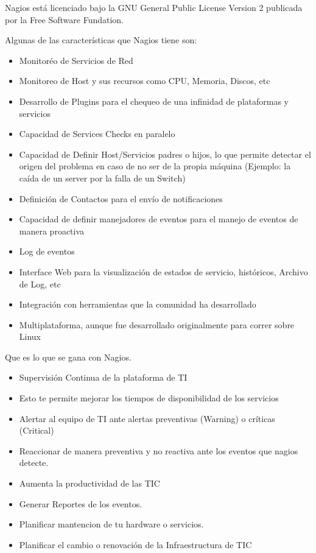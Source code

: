 \documentclass[11pt,a4paper]{article}
\begin{document}
    Nagios está licenciado bajo la GNU General Public License Version 2 publicada por la Free Software Fundation.
    
    Algunas de las características que Nagios tiene son:
\begin{itemize}

\item Monitoréo de Servicios de Red
\item Monitoreo de Host y sus recursos como CPU, Memoria, Discos, etc
\item Desarrollo de Plugins para el chequeo de una infinidad de plataformas y servicios
\item Capacidad de Services Checks en paralelo
\item Capacidad de Definir Host/Servicios padres o hijos, lo que permite detectar el origen del problema en caso de no ser de la propia máquina (Ejemplo: la caída de un server por la falla de un Switch)
\item Definición de Contactos para el envío de notificaciones
\item Capacidad de definir manejadores de eventos para el manejo de eventos de manera proactiva
\item Log de eventos
\item Interface Web para la visualización de estados de servicio, históricos, Archivo de Log, etc
\item Integración con herramientas que la comunidad ha desarrollado
\item Multiplataforma, aunque fue desarrollado originalmente para correr sobre Linux

\end{itemize}

Que es lo que se gana con Nagios.
\begin{itemize}
\item Supervisión Continua de la plataforma de TI
\item Esto te permite mejorar los tiempos de disponibilidad de los servicios
\item Alertar al equipo de TI ante alertas preventivas (Warning) o críticas (Critical)
\item Reaccionar de manera preventiva y no reactiva ante los eventos que nagios detecte.
\item Aumenta la productividad de las TIC
\item Generar Reportes de los eventos.
\item Planificar mantencion de tu hardware o servicios.
\item Planificar el cambio o renovación de la Infraestructura de TIC
\end{itemize}    
\end{document}
